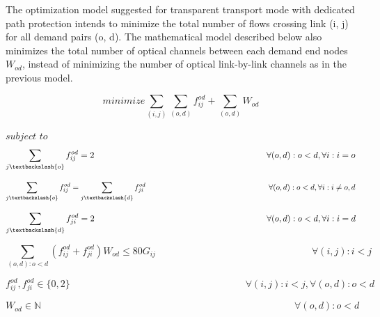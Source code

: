 The optimization model suggested for transparent transport mode with dedicated path protection intends to minimize the total number of flows crossing link (i, j) for all demand pairs (o, d). The mathematical model described below also minimizes the total number of optical channels between each demand end nodes $W_{od}$, instead of minimizing the number of optical link-by-link channels as in the previous model.

\vspace{10pt}
\begin{equation}
minimize    \sum_{(i,j)} \sum_{(o,d)} f_{ij}^{od} + \sum_{(o,d)} W_{od}
\label{ILPTransp}
\end{equation}

$subject$ $to$
\begin{equation}
\sum_{j\textbackslash \{o\}} f_{ij}^{od} = 2  \qquad \qquad \qquad \qquad \qquad \qquad \qquad \qquad \qquad \qquad
\forall(o,d) : o < d, \forall i: i = o
\label{ILPTransp1}
\end{equation}

\begin{equation}
\sum_{j\textbackslash \{o\}} f_{ij}^{od} = \sum_{j\textbackslash \{d\}} f_{ji}^{od}   \qquad \qquad \qquad \qquad \qquad \qquad \qquad \qquad
\forall(o,d) : o < d, \forall i: i \neq o,d
\label{ILPTransp2}
\end{equation}

\begin{equation}
\sum_{j\textbackslash \{d\}} f_{ji}^{od} = 2  \qquad \qquad \qquad \qquad \qquad \qquad \qquad \qquad \qquad \qquad
\forall(o,d) : o < d, \forall i: i = d
\label{ILPTransp3}
\end{equation}

\begin{equation}
\sum_{(o,d):o<d} \left(f_{ij}^{od} + f_{ji}^{od}\right) W_{od} \leq 80 G_{ij} \qquad \qquad \qquad \qquad \qquad \qquad \qquad \qquad
\forall(i,j) : i < j
\label{ILPTransp4}
\end{equation}

\begin{equation}
f_{ij}^{od} , f_{ji}^{od} \in \{0,2\}   \qquad \qquad \qquad \qquad \qquad \qquad \qquad \qquad \qquad
\forall(i,j) : i < j, \forall(o,d) : o < d
\label{ILPTransp5}
\end{equation}

\begin{equation}
W_{od} \in \mathbb{N}  \qquad \qquad \qquad \qquad \qquad \qquad \qquad \qquad \qquad \qquad \qquad \qquad \qquad
\forall(o,d) : o < d
\label{ILPTransp6}
\end{equation}


